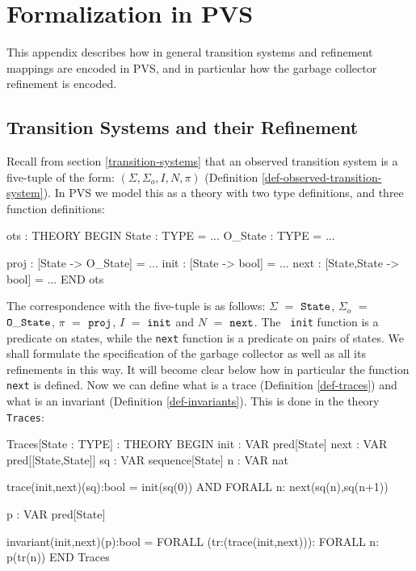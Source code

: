           
\section{Formalization in PVS}
\label{pvs-specifications}

This  appendix   describes   how in  general  transition   systems  and
refinement mappings   are encoded in  PVS,  and in particular  how the
garbage collector refinement is encoded.  


\subsection{Transition Systems and their Refinement}

Recall     from  section  \ref{transition-systems}    that an observed
transition   system      is    a      five-tuple   of     the    form:
$(\Sigma,\Sigma_o,I,N,\pi)$                                (Definition
\ref{def-observed-transition-system})\@. In PVS  we  model this as a  theory
with two type definitions, and  three function definitions:

\begin{smallsession}
ots : THEORY
BEGIN
  State   : TYPE = ...
  O_State : TYPE = ...

  proj : [State -> O_State] = ...
  init : [State -> bool] = ...
  next : [State,State -> bool] = ...
END ots
\end{smallsession}
\label{pvs-ots}

The  correspondence with the   five-tuple is as follows: $\Sigma$  $=$
${\tt  State}$,  $\Sigma_o$  $=$  ${\tt O\_State}$,   $\pi$  $=$ ${\tt
  proj}$, $I$ $=$ ${\tt  init}$ and $N$  $=$  ${\tt next}$.  The  {\tt
  init} function  is  a predicate  on  states,  while the  {\tt  next}
function  is a predicate on  pairs of states.   We shall formulate the
specification of the garbage collector  as well as all its refinements
in this  way.   It  will become clear   below how  in   particular the
function {\tt  next} is defined.   Now we can  define  what is a trace
(Definition \ref{def-traces}) and what   is an  invariant  (Definition
\ref{def-invariants})\@.   This is  done in  the theory  {\tt Traces}:

\begin{smallsession}
Traces[State : TYPE] : THEORY
BEGIN
  init : VAR pred[State]
  next : VAR pred[[State,State]]
  sq   : VAR sequence[State]
  n    : VAR nat

  trace(init,next)(sq):bool =
    init(sq(0)) AND
    FORALL n: next(sq(n),sq(n+1))

  p  : VAR pred[State]

  invariant(init,next)(p):bool =
    FORALL (tr:(trace(init,next))): FORALL n: p(tr(n))
END Traces
\end{smallsession}
\label{pvs-traces}

